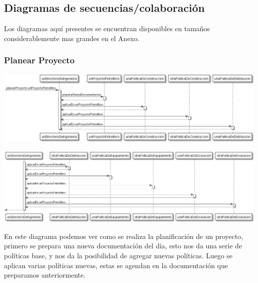 \documentclass[10pt,a4paper]{article}
\begin{document}
\subsection{Diagramas de secuencias/colaboración}

Los diagramas aquí presentes se encuentran disponibles en tamaños considerablemente mas grandes en el Anexo.

\subsubsection{Planear Proyecto}

\centerline{\includegraphics[scale=0.45]{images/secuenciaPlanearProyecto1.png}}
\vspace{0.25cm}
\centerline{\includegraphics[scale=0.45]{images/secuenciaPlanearProyecto2.png}}

En este diagrama podemos ver como se realiza la planificación de un proyecto, primero se prepara una nueva documentación del día, esto nos da una serie de políticas base, y nos da la posibilidad de agregar nuevas políticas. Luego se aplican varias políticas nuevas, estas se agendan en la documentación que preparamos anteriormente.
\end{document}
